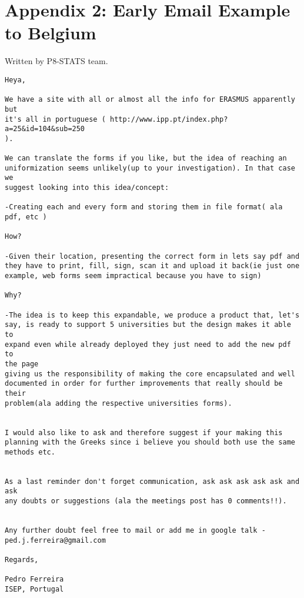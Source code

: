 \chapter{Appendix 2: Early Email Example to Belgium}
Written by P8-STATS team.
\begin{verbatim}
Heya,

We have a site with all or almost all the info for ERASMUS apparently but
it's all in portuguese ( http://www.ipp.pt/index.php?a=25&id=104&sub=250
).

We can translate the forms if you like, but the idea of reaching an
uniformization seems unlikely(up to your investigation). In that case we
suggest looking into this idea/concept:

-Creating each and every form and storing them in file format( ala pdf, etc )

How?

-Given their location, presenting the correct form in lets say pdf and
they have to print, fill, sign, scan it and upload it back(ie just one
example, web forms seem impractical because you have to sign)

Why?

-The idea is to keep this expandable, we produce a product that, let's
say, is ready to support 5 universities but the design makes it able to
expand even while already deployed they just need to add the new pdf to
the page
giving us the responsibility of making the core encapsulated and well
documented in order for further improvements that really should be their
problem(ala adding the respective universities forms).


I would also like to ask and therefore suggest if your making this
planning with the Greeks since i believe you should both use the same
methods etc.


As a last reminder don't forget communication, ask ask ask ask ask and ask
any doubts or suggestions (ala the meetings post has 0 comments!!).


Any further doubt feel free to mail or add me in google talk -
ped.j.ferreira@gmail.com

Regards,

Pedro Ferreira
ISEP, Portugal
\end{verbatim}
